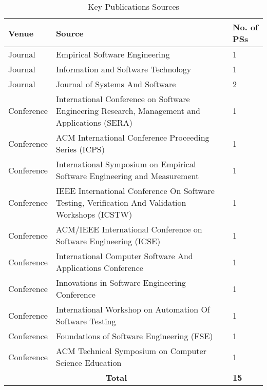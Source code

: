 \documentclass[conference, compsoc, twoside]{IEEEtran}
\begin{document}
\begin{table*}[h]
\centering
  \begin{center}
    \caption{Key Publications Sources}
    \label{tab:keypublicationsources}
    
    \begin{tabular}{l | l | l}
       \textbf{Venue} & \textbf{Source} & \textbf{No. of PSs}\\
       \hline
        Journal & Empirical Software Engineering & 1 \\ 
        Journal & Information and Software Technology & 1 \\
        Journal & Journal of Systems And Software & 2 \\
        Conference & International Conference on Software Engineering Research, Management and Applications (SERA) & 1 \\
        Conference & ACM International Conference Proceeding Series (ICPS) & 1 \\
        Conference & International Symposium on Empirical Software Engineering and Measurement & 1 \\
        Conference & IEEE International Conference On Software Testing, Verification And Validation Workshops (ICSTW) & 1 \\
        Conference & ACM/IEEE International Conference on Software Engineering (ICSE) & 1 \\
        Conference & International Computer Software And Applications Conference & 1 \\
        Conference & Innovations in Software Engineering Conference & 1 \\
        Conference & International Workshop on Automation Of Software Testing & 1 \\
        Conference & Foundations of Software Engineering (FSE) & 1 \\
        Conference & ACM Technical Symposium on Computer Science Education & 1 \\
        \multicolumn{2}{c}{\textbf{Total}} & \textbf{15}
    \end{tabular}
    
  \end{center}
\end{table*}
\end{document}
